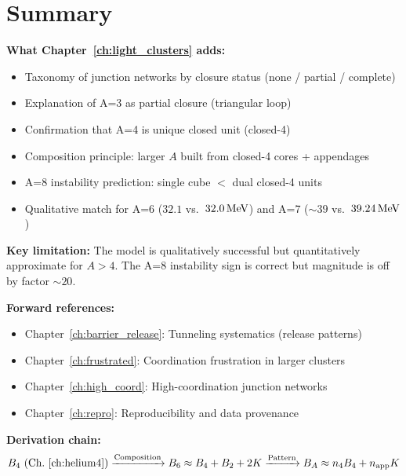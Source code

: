 \section{Summary}
\label{sec:light:summary}

\begin{resultbox}
    \textbf{What Chapter~\ref{ch:light_clusters} adds:}
    \begin{itemize}
        \item Taxonomy of junction networks by closure status
              (none / partial / complete)
        \item Explanation of A=3 as partial closure (triangular loop)
        \item Confirmation that A=4 is unique closed unit (closed-4)
        \item Composition principle: larger $A$ built from closed-4 cores
              + appendages
        \item A=8 instability prediction: single cube $<$ dual closed-4 units
        \item Qualitative match for A=6 ($32.1$ vs.\ $32.0\,\mathrm{MeV}$) and
              A=7 ($\sim 39$ vs.\ $39.24\,\mathrm{MeV}$)
    \end{itemize}

    \textbf{Key limitation:} The model is qualitatively successful but
    quantitatively approximate for $A > 4$. The A=8 instability sign
    is correct but magnitude is off by factor $\sim 20$.
\end{resultbox}

\bigskip
\noindent
\textbf{Forward references:}
\begin{itemize}
    \item Chapter~\ref{ch:barrier_release}: Tunneling systematics (release patterns)
    \item Chapter~\ref{ch:frustrated}: Coordination frustration in larger
          clusters
    \item Chapter~\ref{ch:high_coord}: High-coordination junction networks
    \item Chapter~\ref{ch:repro}: Reproducibility and data provenance
\end{itemize}

\bigskip
\noindent
\textbf{Derivation chain:}
\begin{equation*}
    B_4 \text{ (Ch.~\ref{ch:helium4})}
    \xrightarrow{\text{Composition}}
    B_6 \approx B_4 + B_2 + 2K
    \xrightarrow{\text{Pattern}}
    B_A \approx n_4 B_4 + n_{\text{app}} K
\end{equation*}

